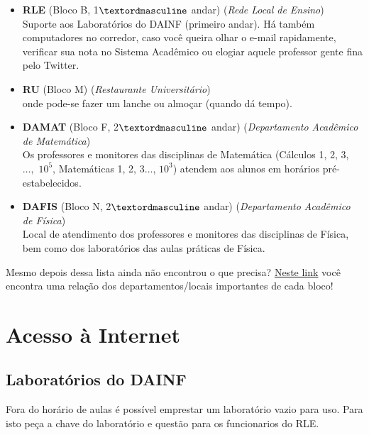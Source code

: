\documentclass[a4paper,12pt,openany]{article}
\begin{document}
\begin{itemize}
\item \textbf{RLE} (Bloco B, 1$\textordmasculine$ andar) (\textit{Rede Local de Ensino}) \\Suporte aos Laboratórios do DAINF (primeiro andar). Há também computadores no corredor, caso você queira olhar o e-mail rapidamente, verificar sua nota no Sistema Acadêmico ou elogiar aquele professor gente fina pelo Twitter.

\item \textbf{RU} (Bloco M) (\textit{Restaurante Universitário})\\ onde pode-se fazer um lanche ou almoçar (quando dá tempo).

\item \textbf{DAMAT} (Bloco F, 2$\textordmasculine$ andar) (\textit{Departamento Acadêmico de Matemática})\\ Os professores e monitores das disciplinas de Matemática (Cálculos 1, 2, 3, $\ldots,$ $10^5$, Matemáticas 1, 2, 3$\ldots$, $10^3$) atendem aos alunos em horários pré-estabelecidos.

\item \textbf{DAFIS} (Bloco N, 2$\textordmasculine$ andar) (\textit{Departamento Acadêmico de Física})\\  Local de atendimento dos professores e monitores das disciplinas de Física, bem como dos laboratórios das aulas práticas de Física.

\end{itemize}

Mesmo depois dessa lista ainda não encontrou o que precisa? \href{http://200.134.25.110/mapa/mapa.html}{Neste link} você encontra uma relação dos departamentos/locais importantes de cada bloco!


\newpage
\section{Acesso à Internet}

\subsection{Laboratórios do DAINF}

Fora do horário de aulas é possível emprestar um laboratório vazio para uso. Para isto peça a chave do laboratório e questão para os funcionarios do RLE.
\end{document}
